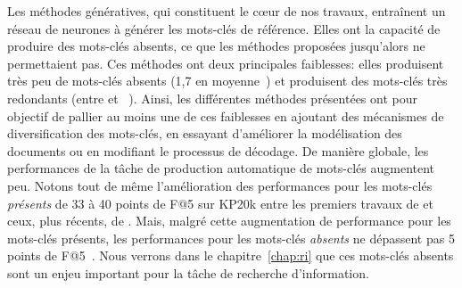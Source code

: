 Les méthodes génératives, qui constituent le c\oe{}ur de nos travaux, entraînent un réseau de neurones à générer les mots-clés de référence.
Elles ont la capacité de produire des mots-clés absents, ce que les méthodes proposées jusqu'alors ne permettaient pas.
Ces méthodes ont deux principales faiblesses: elles produisent très peu de mots-clés absents (1,7 en moyenne~\cite{chan_neural_2019}) et produisent des mots-clés très redondants (entre   et ~\cite{chen_exclusive_2020}).
%
Ainsi, les différentes méthodes présentées ont pour objectif de pallier au moins une de ces faiblesses en ajoutant des mécanismes de diversification des mots-clés, en essayant d'améliorer la modélisation des documents ou en modifiant le processus de décodage.
De manière globale, les performances de la tâche de production automatique de mots-clés augmentent peu.
Notons tout de même l'amélioration des performances pour les mots-clés \emph{présents} de 33 à 40 points de F@5 sur KP20k entre les premiers travaux de \citet{meng_deep_2017} et ceux, plus récents, de \citet{ye_heterogeneous_2021}.
Mais, malgré cette augmentation de performance pour les mots-clés présents, les performances pour les mots-clés \emph{absents} ne dépassent pas 5 points de F@5~\cite{chan_neural_2019,ye_heterogeneous_2021}.
%
Nous verrons dans le chapitre~\ref{chap:ri} que ces mots-clés absents sont un enjeu important pour la tâche de recherche d'information.




%
